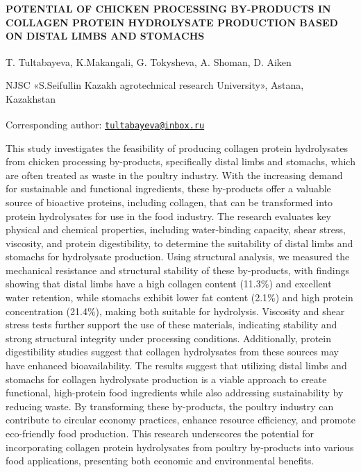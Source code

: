 
{\bfseries POTENTIAL OF CHICKEN PROCESSING BY-PRODUCTS IN COLLAGEN PROTEIN
HYDROLYSATE PRODUCTION BASED ON DISTAL LIMBS AND STOMACHS}

T. Tultabayeva{\bfseries \textsuperscript{\envelope }}, K.Makangali, G. Tokysheva,
A. Shoman, D. Aiken

NJSC «S.Seifullin Kazakh agrotechnical research University», Astana,
Kazakhstan

{\bfseries \textsuperscript{\envelope }}Corresponding author:
\href{mailto:tultabayeva@inbox.ru}{\nolinkurl{tultabayeva@inbox.ru}}

This study investigates the feasibility of producing collagen protein
hydrolysates from chicken processing by-products, specifically distal
limbs and stomachs, which are often treated as waste in the poultry
industry. With the increasing demand for sustainable and functional
ingredients, these by-products offer a valuable source of bioactive
proteins, including collagen, that can be transformed into protein
hydrolysates for use in the food industry. The research evaluates key
physical and chemical properties, including water-binding capacity,
shear stress, viscosity, and protein digestibility, to determine the
suitability of distal limbs and stomachs for hydrolysate production.
Using structural analysis, we measured the mechanical resistance and
structural stability of these by-products, with findings showing that
distal limbs have a high collagen content (11.3\%) and excellent water
retention, while stomachs exhibit lower fat content (2.1\%) and high
protein concentration (21.4\%), making both suitable for hydrolysis.
Viscosity and shear stress tests further support the use of these
materials, indicating stability and strong structural integrity under
processing conditions. Additionally, protein digestibility studies
suggest that collagen hydrolysates from these sources may have enhanced
bioavailability. The results suggest that utilizing distal limbs and
stomachs for collagen hydrolysate production is a viable approach to
create functional, high-protein food ingredients while also addressing
sustainability by reducing waste. By transforming these by-products, the
poultry industry can contribute to circular economy practices, enhance
resource efficiency, and promote eco-friendly food production. This
research underscores the potential for incorporating collagen protein
hydrolysates from poultry by-products into various food applications,
presenting both economic and environmental benefits.

